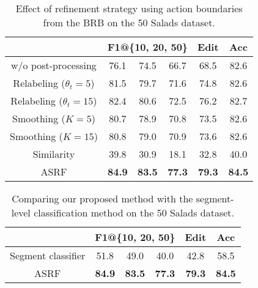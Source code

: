 \documentclass[10pt,twocolumn,letterpaper]{article}
\begin{document}
\begin{table}[t]
\small
\centering
\begin{tabular}{cccccc}
\hline
                              & \multicolumn{3}{c}{F1@\{10, 20, 50\}} & Edit & Acc \\ \hline
w/o post-processing           & 76.1          & 74.5          & 66.7          & 68.5          & 82.6 \\
Relabeling ($\theta_t = 5$)   & 81.5          & 79.7          & 71.6          & 74.8          & 82.6 \\
Relabeling ($\theta_t = 15$)  & 82.4          & 80.6          & 72.5          & 76.2          & 82.7 \\
Smoothing ($K = 5$)           & 80.7          & 78.9          & 70.8          & 73.5          & 82.6 \\
Smoothing ($K = 15$)          & 80.8          & 79.0          & 70.9          & 73.6          & 82.6 \\
Similarity                    & 39.8          & 30.9          & 18.1          & 32.8          & 40.0\\ \hline
ASRF                          & \textbf{84.9} & \textbf{83.5} & \textbf{77.3} & \textbf{79.3} & \textbf{84.5}  \\ \hline
\end{tabular}
\caption{Effect of refinement strategy using action boundaries from the BRB on the 50 Salads dataset.}
\label{tab:BRN}
\vspace{-3pt}
\end{table}


\begin{table}[t]
\small
\centering
\begin{tabular}{cccccc}
\hline
                                  & \multicolumn{3}{c}{F1@\{10, 20, 50\}} & Edit & Acc \\ \hline
Segment classifier                & 51.8   & 49.0   & 40.0   & 42.8   & 58.5   \\
ASRF                              & \textbf{84.9} & \textbf{83.5} & \textbf{77.3} & \textbf{79.3} & \textbf{84.5}   \\ \hline
\end{tabular}
\caption{Comparing our proposed method with the segment-level classification method on the 50 Salads dataset.}
\label{tab:seg_lev_cls}
\vspace{-5pt}
\end{table}
\end{document}
